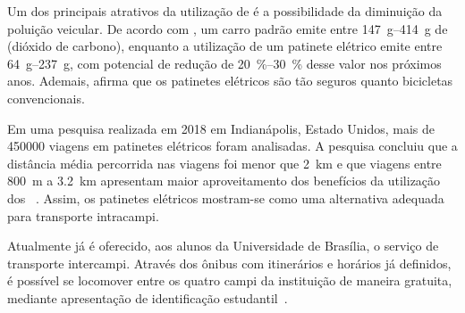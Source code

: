 Um dos principais atrativos da utilização de  é a possibilidade da diminuição da poluição veicular. De acordo com \textcite{boglietti2021}, um carro padrão emite entre \qtyrange{147}{414}{\gram} de  (dióxido de carbono), enquanto  a utilização de um patinete elétrico emite entre \qtyrange{64}{237}{\gram}, com potencial de redução de \qtyrange{20}{30}{\percent} desse valor nos próximos anos. Ademais, \textcite{silva2019} afirma que os patinetes elétricos são tão seguros quanto bicicletas convencionais.

Em uma pesquisa realizada em 2018 em Indianápolis, Estado Unidos, mais de \num{450 000} viagens em patinetes elétricos foram analisadas. A pesquisa concluiu que a distância média percorrida nas viagens foi menor que \SI{2}{\km} e que viagens entre \SI{800}{\meter} a \SI{3,2}{\km} apresentam maior aproveitamento dos benefícios da utilização dos ~\cite{matthew2019}. Assim, os patinetes elétricos mostram-se como uma alternativa adequada para transporte intracampi.

Atualmente já é oferecido, aos alunos da Universidade de Brasília, o serviço de transporte intercampi. Através dos ônibus com itinerários e horários já definidos, é possível se locomover entre os quatro campi da instituição de maneira gratuita, mediante apresentação de identificação estudantil~\cite{secomunb2018}.

